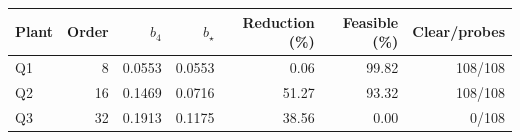 \begin{tabular}{lrrrrrr}\toprule
Plant & Order & $b_4$ & $b_\star$ & Reduction (\%) & Feasible (\%) & Clear/probes \\\midrule
Q1 & 8 & 0.0553 & 0.0553 & 0.06 & 99.82 & 108/108 \\
Q2 & 16 & 0.1469 & 0.0716 & 51.27 & 93.32 & 108/108 \\
Q3 & 32 & 0.1913 & 0.1175 & 38.56 & 0.00 & 0/108 \\
\bottomrule\end{tabular}
